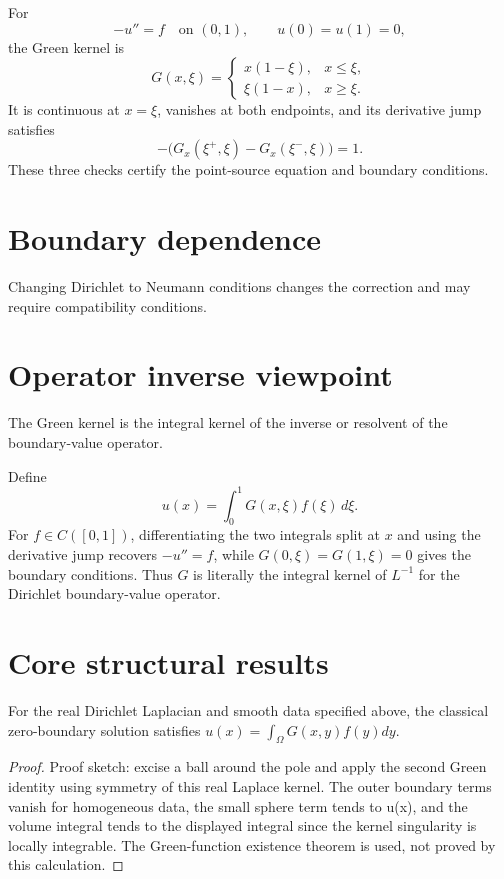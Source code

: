 \begin{example}\label{ex:iii25-expand-01}
For
\[
-u''=f\quad\text{on }(0,1),\qquad u(0)=u(1)=0,
\]
the Green kernel is
\[
G(x,\xi)=
\begin{cases}
x(1-\xi),&x\le\xi,\\
\xi(1-x),&x\ge\xi.
\end{cases}
\]
It is continuous at \(x=\xi\), vanishes at both endpoints, and its derivative
jump satisfies
\[
-\bigl(G_x(\xi^+,\xi)-G_x(\xi^-,\xi)\bigr)=1.
\]
These three checks certify the point-source equation and boundary conditions.
\end{example}
\section{Boundary dependence}
Changing Dirichlet to Neumann conditions changes the correction and may require compatibility conditions.

\section{Operator inverse viewpoint}
The Green kernel is the integral kernel of the inverse or resolvent of the boundary-value operator.


\begin{example}\label{ex:iii25-expand-03}
Define
\[
u(x)=\int_0^1G(x,\xi)f(\xi)\,d\xi.
\]
For \(f\in C([0,1])\), differentiating the two integrals split at \(x\) and using the derivative jump recovers
\(-u''=f\), while \(G(0,\xi)=G(1,\xi)=0\) gives the boundary conditions.
Thus \(G\) is literally the integral kernel of \(L^{-1}\) for the Dirichlet
boundary-value operator.
\end{example}
\section{Core structural results}

\begin{theorem}\label{thm:iii25-01}
For the real Dirichlet Laplacian and smooth data specified above, the classical zero-boundary solution satisfies $u(x)=\int_\Omega G(x,y)f(y)dy$.
\begin{proof}
Proof sketch: excise a ball around the pole and apply the second Green identity using symmetry of this real Laplace kernel. The outer boundary terms vanish for homogeneous data, the small sphere term tends to u(x), and the volume integral tends to the displayed integral since the kernel singularity is locally integrable. The Green-function existence theorem is used, not proved by this calculation.
\end{proof}
\end{theorem}

